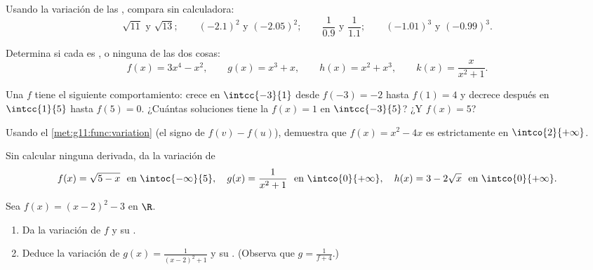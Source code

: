\begin{exercise}[$\star$]\label{exo:g11:func:2}
Usando la variación de las , compara sin
calculadora:
\[
\sqrt{11} \text{ y } \sqrt{13}; \qquad
(-2.1)^2 \text{ y } (-2.05)^2; \qquad
\frac{1}{0.9} \text{ y } \frac{1}{1.1}; \qquad
(-1.01)^3 \text{ y } (-0.99)^3 .
\]
\end{exercise}

\begin{exercise}[$\star$]\label{exo:g11:func:3}
Determina si cada  es ,  o ninguna de las dos cosas:
\[
f(x) = 3x^4 - x^2, \qquad
g(x) = x^3 + x, \qquad
h(x) = x^2 + x^3, \qquad
k(x) = \frac{x}{x^2+1} .
\]
\end{exercise}

\begin{exercise}[$\star$]\label{exo:g11:func:4}
Una  $f$ tiene el siguiente comportamiento: crece en
$\intcc{-3}{1}$ desde $f(-3) = -2$ hasta $f(1) = 4$ y decrece después en
$\intcc{1}{5}$ hasta $f(5) = 0$. ¿Cuántas soluciones tiene la 
$f(x) = 1$ en $\intcc{-3}{5}$? ¿Y $f(x) = 5$?
\end{exercise}

\begin{exercise}[$\star\star$]\label{exo:g11:func:5}
Usando el \cref{met:g11:func:variation} (el signo de $f(v) - f(u)$),
demuestra que $f(x) = x^2 - 4x$ es estrictamente  en
$\intco{2}{+\infty}$.
\end{exercise}

\begin{exercise}[$\star\star$]\label{exo:g11:func:6}
Sin calcular ninguna derivada, da la variación de
\[
f(x) = \sqrt{5 - x} \ \text{ en } \intoc{-\infty}{5},
\quad
g(x) = \frac{1}{x^2 + 1} \ \text{ en } \intco{0}{+\infty},
\quad
h(x) = 3 - 2\sqrt{x} \ \text{ en } \intco{0}{+\infty}.
\]
\end{exercise}

\begin{exercise}[$\star\star$]\label{exo:g11:func:7}
Sea $f(x) = (x-2)^2 - 3$ en $\R$.
\begin{enumerate}
  \item Da la variación de $f$ y su .
  \item Deduce la variación de $g(x) = \frac{1}{(x-2)^2+1}$ y su .
        (Observa que $g = \frac{1}{f + 4}$.)
\end{enumerate}
\end{exercise}


